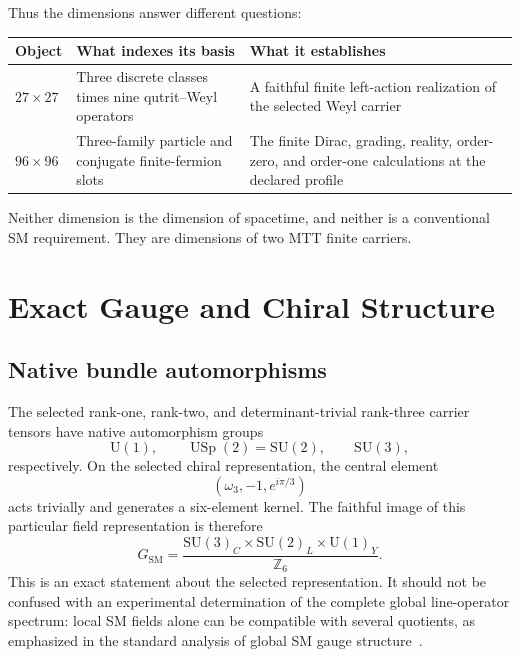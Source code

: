 \documentclass[11pt]{article}
\newcommand{\Z}{\mathbb{Z}}
\newcommand{\SU}{\mathrm{SU}}
\newcommand{\U}{\mathrm{U}}
\newcommand{\SM}{\mathrm{SM}}
\begin{document}
Thus the dimensions answer different questions:
\begin{center}
\begin{tabularx}{0.94\textwidth}{@{}L{0.17\textwidth}Y Y@{}}
\toprule
Object & What indexes its basis & What it establishes \\
\midrule
$27\times27$ & Three discrete classes times nine qutrit--Weyl operators & A faithful finite
left-action realization of the selected Weyl carrier \\
$96\times96$ & Three-family particle and conjugate finite-fermion slots & The finite Dirac,
grading, reality, order-zero, and order-one calculations at the declared profile \\
\bottomrule
\end{tabularx}
\end{center}
Neither dimension is the dimension of spacetime, and neither is a conventional SM requirement.
They are dimensions of two MTT finite carriers.

\section{Exact Gauge and Chiral Structure}

\subsection{Native bundle automorphisms}

The selected rank-one, rank-two, and determinant-trivial rank-three carrier tensors have native
automorphism groups
\begin{equation}
\U(1),\qquad \operatorname{USp}(2)=\SU(2),\qquad \SU(3),
\end{equation}
respectively.  On the selected chiral representation, the central element
\begin{equation}
(\omega_3,-1,e^{i\pi/3})
\end{equation}
acts trivially and generates a six-element kernel.  The faithful image of this particular
field representation is therefore
\begin{equation}
G_{\SM}=\frac{\SU(3)_C\times\SU(2)_L\times\U(1)_Y}{\Z_6}.
\end{equation}
This is an exact statement about the selected representation.  It should not be confused with
an experimental determination of the complete global line-operator spectrum: local SM fields
alone can be compatible with several quotients, as emphasized in the standard analysis of
global SM gauge structure~\cite{Tong2017}.
\end{document}
